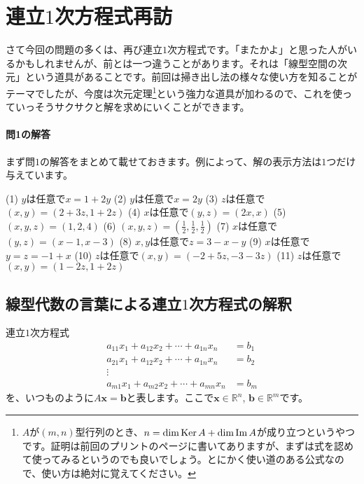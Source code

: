 \section{連立$1$次方程式再訪}


さて今回の問題の多くは、再び連立$1$次方程式です。「またかよ」と思った人がいるかもしれませんが、前とは一つ違うことがあります。それは「線型空間の次元」という道具があることです。前回は掃き出し法の様々な使い方を知ることがテーマでしたが、今度は次元定理\footnote{$A$が$(m, n)$型行列のとき、$n = \dim \operatorname{Ker} A + \dim \mathrm{Im}\, A$が成り立つというやつです。証明は前回のプリントの\pageref{paragraph:dimension_theorem}ページに書いてありますが、まずは式を認めて使ってみるというのでも良いでしょう。とにかく使い道のある公式なので、使い方は絶対に覚えてください。}という強力な道具が加わるので、これを使っていっそうサクサクと解を求めにいくことができます。

\paragraph{問1の解答}

まず問$1$の解答をまとめて載せておきます。例によって、解の表示方法は$1$つだけ与えています。

\noindent (1) $y$は任意で$x = 1 + 2y$ (2) $y$は任意で$x = 2y$ (3) $z$は任意で$(x, y) = (2 + 3z, 1 + 2z)$ (4) $x$は任意で$(y, z) = (2x, x)$ (5) $(x, y, z) = (1, 2, 4)$ (6) $(x, y, z) = (\frac{1}{2}, \frac{1}{2}, \frac{1}{2})$ (7) $x$は任意で$(y, z) = (x - 1, x - 3)$ (8) $x, y$は任意で$z = 3 - x - y$ (9) $x$は任意で$y = z = -1 + x$ (10) $z$は任意で$(x, y) = (-2 + 5z, -3 - 3z)$ (11) $z$は任意で$(x, y) = (1 - 2z, 1 + 2z)$


\subsection{線型代数の言葉による連立$1$次方程式の解釈}

連立$1$次方程式
\begin{align*}
a_{11} x_1 + a_{12} x_2 + \cdots + a_{1n} x_n &= b_1 \\
a_{21} x_1 + a_{12} x_2 + \cdots + a_{1n} x_n &= b_2 \\
\vdots \\
a_{m1} x_1 + a_{m2} x_2 + \cdots + a_{mn} x_n &= b_m
\end{align*}
を、いつものように$A\bm{x} = \bm{b}$と表します。ここで$\bm{x} \in \mathbb{R}^n$, $\bm{b} \in \mathbb{R}^m$です。

